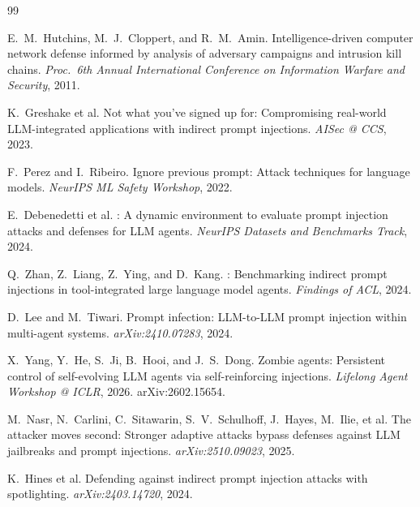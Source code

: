 \documentclass{article}
\begin{document}

\begin{thebibliography}{99}

E.~M.~Hutchins, M.~J.~Cloppert, and R.~M.~Amin.
\newblock Intelligence-driven computer network defense informed by analysis of
  adversary campaigns and intrusion kill chains.
\newblock \emph{Proc.\ 6th Annual International Conference on Information
  Warfare and Security}, 2011.

K.~Greshake et al.
\newblock Not what you've signed up for: Compromising real-world
  LLM-integrated applications with indirect prompt injections.
\newblock \emph{AISec @ CCS}, 2023.

F.~Perez and I.~Ribeiro.
\newblock Ignore previous prompt: Attack techniques for language models.
\newblock \emph{NeurIPS ML Safety Workshop}, 2022.

E.~Debenedetti et al.
: A dynamic environment to evaluate prompt injection
  attacks and defenses for {LLM} agents.
\newblock \emph{NeurIPS Datasets and Benchmarks Track}, 2024.

Q.~Zhan, Z.~Liang, Z.~Ying, and D.~Kang.
: Benchmarking indirect prompt injections in
  tool-integrated large language model agents.
\newblock \emph{Findings of ACL}, 2024.

D.~Lee and M.~Tiwari.
\newblock Prompt infection: {LLM}-to-{LLM} prompt injection within
  multi-agent systems.
\newblock \emph{arXiv:2410.07283}, 2024.

X.~Yang, Y.~He, S.~Ji, B.~Hooi, and J.~S.~Dong.
\newblock Zombie agents: Persistent control of self-evolving {LLM} agents
  via self-reinforcing injections.
\newblock \emph{Lifelong Agent Workshop @ ICLR}, 2026.
\newblock arXiv:2602.15654.

M.~Nasr, N.~Carlini, C.~Sitawarin, S.~V.~Schulhoff, J.~Hayes, M.~Ilie,
  et al.
\newblock The attacker moves second: Stronger adaptive attacks bypass
  defenses against {LLM} jailbreaks and prompt injections.
\newblock \emph{arXiv:2510.09023}, 2025.

K.~Hines et al.
\newblock Defending against indirect prompt injection attacks with
  spotlighting.
\newblock \emph{arXiv:2403.14720}, 2024.


\end{thebibliography}
\end{document}
